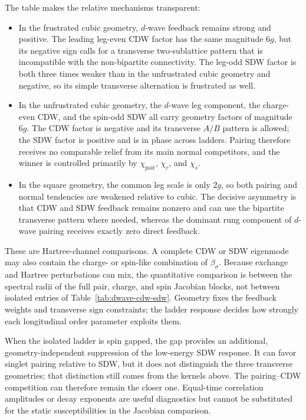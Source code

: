 \documentclass[11pt]{article}
\begin{document}
The table makes the relative mechanisms transparent:
\begin{itemize}
 \item In the frustrated cubic geometry, \(d\)-wave feedback remains strong and
       positive.  The leading leg-even CDW factor has the same magnitude
       \(6g\), but its negative sign calls for a transverse two-sublattice
       pattern that is incompatible with the non-bipartite connectivity.  The
       leg-odd SDW factor is both three times weaker than in the unfrustrated
       cubic geometry and negative, so its simple transverse alternation is
       frustrated as well.
 \item In the unfrustrated cubic geometry, the \(d\)-wave leg component, the
       charge-even CDW, and the spin-odd SDW all carry geometry factors of
       magnitude \(6g\).  The CDW factor is negative and its transverse
       \(A/B\) pattern is allowed; the SDW factor is positive and is in phase
       across ladders.  Pairing therefore receives no comparable relief from
       its main normal competitors, and the winner is controlled primarily by
       \(\chi_{\mathrm{pair}}\), \(\chi_c\), and \(\chi_s\).
 \item In the square geometry, the common leg scale is only \(2g\), so both
       pairing and normal tendencies are weakened relative to cubic.  The
       decisive asymmetry is that CDW and SDW feedback remains nonzero and can
       use the bipartite transverse pattern where needed, whereas the dominant
       rung component of \(d\)-wave pairing receives exactly zero direct
       feedback.
\end{itemize}

These are Hartree-channel comparisons.  A complete CDW or SDW eigenmode may
also contain the charge- or spin-like combination of \(\beta_\sigma\).  Because
exchange and Hartree perturbations can mix, the quantitative comparison is
between the spectral radii of the full pair, charge, and spin Jacobian blocks,
not between isolated entries of Table~\ref{tab:dwave-cdw-sdw}.  Geometry fixes
the feedback weights and transverse sign constraints; the ladder response
decides how strongly each longitudinal order parameter exploits them.

When the isolated ladder is spin gapped, the gap provides an additional,
geometry-independent suppression of the low-energy SDW response.  It can favor
singlet pairing relative to SDW, but it does not distinguish the three
transverse geometries; that distinction still comes from the kernels above.
The pairing--CDW competition can therefore remain the closer one.  Equal-time
correlation amplitudes or decay exponents are useful diagnostics but cannot be
substituted for the static susceptibilities in the Jacobian comparison.
\end{document}

